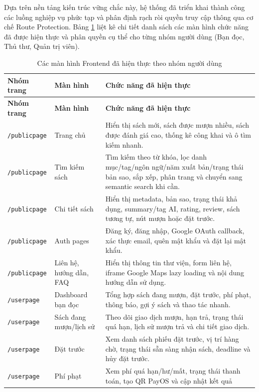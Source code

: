 Dựa trên nền tảng kiến trúc vững chắc này, hệ thống đã triển khai thành công các luồng nghiệp vụ phức tạp và phân định rạch ròi quyền truy cập thông qua cơ chế Route Protection. Bảng \ref{tab:fe_pages_implemented} liệt kê chi tiết danh sách các màn hình chức năng đã được hiện thực và phân quyền cụ thể cho từng nhóm người dùng (Bạn đọc, Thủ thư, Quản trị viên).

\begin{longtable}{|p{2.9cm}|p{4.2cm}|p{7.2cm}|}
\caption{Các màn hình Frontend đã hiện thực theo nhóm người dùng}
\label{tab:fe_pages_implemented}\\
\hline
\textbf{Nhóm trang} & \textbf{Màn hình} & \textbf{Chức năng đã hiện thực} \\
\hline
\endfirsthead
\hline
\textbf{Nhóm trang} & \textbf{Màn hình} & \textbf{Chức năng đã hiện thực} \\
\hline
\endhead
\texttt{/publicpage} & Trang chủ &
Hiển thị sách mới, sách được mượn nhiều, sách được đánh giá cao, thống kê công
khai và ô tìm kiếm nhanh. \\
\hline
\texttt{/publicpage} & Tìm kiếm sách &
Tìm kiếm theo từ khóa, lọc danh mục/tag/ngôn ngữ/năm xuất bản/trạng thái bản
sao, sắp xếp, phân trang và chuyển sang semantic search khi cần. \\
\hline
\texttt{/publicpage} & Chi tiết sách &
Hiển thị metadata, bản sao, trạng thái khả dụng, summary/tag AI, rating, review,
sách tương tự, nút mượn hoặc đặt trước. \\
\hline
\texttt{/publicpage} & Auth pages &
Đăng ký, đăng nhập, Google OAuth callback, xác thực email, quên mật khẩu và đặt
lại mật khẩu. \\
\hline
\texttt{/publicpage} & Liên hệ, hướng dẫn, FAQ &
Hiển thị thông tin thư viện, form liên hệ, iframe Google Maps lazy loading và
nội dung hướng dẫn sử dụng. \\
\hline
\texttt{/userpage} & Dashboard bạn đọc &
Tổng hợp sách đang mượn, đặt trước, phí phạt, thông báo, gợi ý sách và thao tác
nhanh. \\
\hline
\texttt{/userpage} & Sách đang mượn/lịch sử &
Theo dõi giao dịch mượn, hạn trả, trạng thái quá hạn, lịch sử mượn trả và chi
tiết giao dịch. \\
\hline
\texttt{/userpage} & Đặt trước &
Xem danh sách phiếu đặt trước, vị trí hàng chờ, trạng thái sẵn sàng nhận sách,
deadline và hủy đặt trước. \\
\hline
\texttt{/userpage} & Phí phạt &
Xem phí quá hạn/hư/mất, trạng thái thanh toán, tạo QR PayOS và cập nhật kết quả

\end{longtable}

